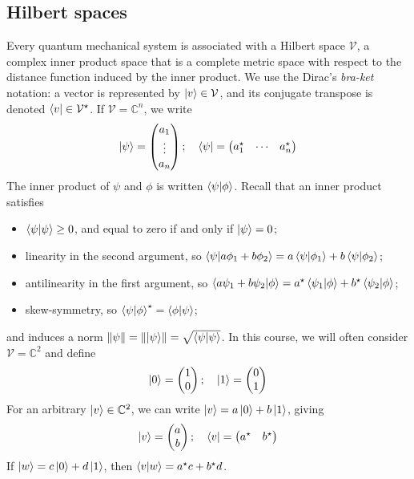 \subsection{Hilbert spaces}
Every quantum mechanical system is associated with a Hilbert space \( \mathcal V \), a complex inner product space that is a complete metric space with respect to the distance function induced by the inner product.
We use the Dirac's \emph{bra-ket} notation: a vector is represented by \( \ket{v} \in \mathcal V \), and its conjugate transpose is denoted \( \bra{v} \in \mathcal V^\star \).
If \( \mathcal V = \mathbb C^n \), we write
\[ \ket{\psi} = \begin{pmatrix}
    a_1 \\
    \vdots \\
    a_n
\end{pmatrix};\quad \bra{\psi} = \begin{pmatrix}
    a_1^\star & \cdots & a_n^\star
\end{pmatrix} \]
The inner product of \( \psi \) and \( \phi \) is written \( \bra{\psi}\ket{\phi} \).
Recall that an inner product satisfies
\begin{itemize}
    \item \( \bra{\psi}\ket{\psi} \geq 0 \), and equal to zero if and only if \( \ket{\psi} = 0 \);
    \item linearity in the second argument, so \( \bra{\psi}\ket{a\phi_1 + b\phi_2} = a \bra{\psi}\ket{\phi_1} + b \bra{\psi}\ket{\phi_2} \);
    \item antilinearity in the first argument, so \( \bra{a\psi_1 + b\psi_2}\ket{\phi} = a^\star \bra{\psi_1}\ket{\phi} + b^\star \bra{\psi_2}\ket{\phi} \);
    \item skew-symmetry, so \( \bra{\psi}\ket{\phi}^\star = \bra{\phi}\ket{\psi} \);
\end{itemize}
and induces a norm \( \norm{\psi} = \norm{\ket{\psi}} = \sqrt{\bra{\psi}\ket{\psi}} \).
In this course, we will often consider \( \mathcal V = \mathbb C^2 \) and define
\[ \ket{0} = \begin{pmatrix}
    1 \\ 0
\end{pmatrix};\quad \ket{1} = \begin{pmatrix}
    0 \\ 1
\end{pmatrix} \]
For an arbitrary \( \ket{v} \in \mathbb C^2 \), we can write \( \ket{v} = a \ket{0} + b \ket{1} \), giving
\[ \ket{v} = \begin{pmatrix}
    a \\ b
\end{pmatrix};\quad \bra{v} = \begin{pmatrix}
    a^\star & b^\star
\end{pmatrix} \]
If \( \ket{w} = c \ket{0} + d \ket{1} \), then \( \ip{v}{w} = a^\star c + b^\star d \).

